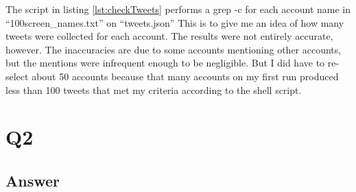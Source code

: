 \documentclass[12pt]{article}
\begin{document}
The script in listing \ref{lst:checkTweets} performs a grep -c for each account name in ``100screen\_names.txt'' on ``tweets.json''  This is to give me an idea of how many tweets were collected for each account.  The results were not entirely accurate, however.  The inaccuracies are due to some accounts mentioning other accounts, but the mentions were infrequent enough to be negligible.  But I did have to re-select about 50 accounts because that many accounts on my first run produced less than 100 tweets that met my criteria according to the shell script.


\section*{Q2}

\subsection*{Answer}










\end{document}
